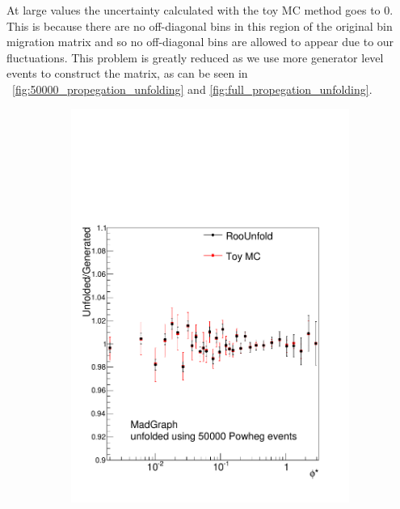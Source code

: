 At large \phistar values the uncertainty calculated with the toy MC method goes
to \num{0}. This is because there are no off-diagonal bins in this region of
the original bin migration matrix and so no off-diagonal bins are allowed to
appear due to our fluctuations. This problem is greatly reduced as we use more
generator level events to construct the matrix, as can be seen in
\FIGS~\ref{fig:50000_propegation_unfolding} and
\ref{fig:full_propegation_unfolding}.

\begin{figure}[!htbp]
    \centering
    \begin{subfigure}[b]{\SideBySidePlotWidth}
        \includegraphics[width=\textwidth]{figures/BinM_PM_50000.pdf}
        \caption{}
        \label{fig:unfolding_madgraph_with_50000}
    \end{subfigure}%
    \begin{subfigure}[b]{\SideBySidePlotWidth}

\end{subfigure}
\end{figure}
